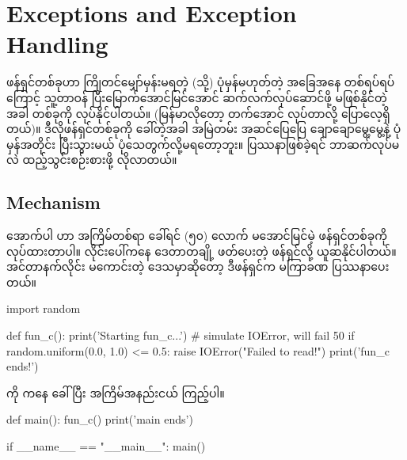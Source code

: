 \chapter{Exceptions and Exception Handling}

ဖန်ရှင်တစ်ခုဟာ ကြိုတင်မျှော်မှန်းမရတဲ့ (သို့) ပုံမှန်မဟုတ်တဲ့ အခြေအနေ တစ်ရပ်ရပ်ကြောင့် သူ့တာဝန် ပြီးမြောက်အောင်မြင်အောင် ဆက်လက်လုပ်ဆောင်ဖို့ မဖြစ်နိုင်တဲ့အခါ  တစ်ခုကို   လုပ်နိုင်ပါတယ်။ (မြန်မာလိုတော့  တက်အောင် လုပ်တာလို့ ပြောလေ့ရှိတယ်)။ ဒီလိုဖန်ရှင်တစ်ခုကို ခေါ်တဲ့အခါ အမြဲတမ်း အဆင်ပြေပြေ ချောချောမွေ့မွေ့နဲ့ ပုံမှန်အတိုင်း ပြီးသွားမယ် ပုံသေတွက်လို့မရတော့ဘူး။ ပြဿနာဖြစ်ခဲ့ရင် ဘာဆက်လုပ်မလဲ ထည့်သွင်းစဉ်းစားဖို့ လိုလာတယ်။
\section{Mechanism}


အောက်ပါ  ဟာ အကြိမ်တစ်ရာ ခေါ်ရင် (၅၀) လောက် မအောင်မြင်မဲ့ ဖန်ရှင်တစ်ခုကို  လုပ်ထားတာပါ။ လိုင်းပေါ်ကနေ ဒေတာတချို့ ဖတ်ပေးတဲ့ ဖန်ရှင်လို့ ယူဆနိုင်ပါတယ်။  အင်တာနက်လိုင်း မကောင်းတဲ့ ဒေသမှာဆိုတော့ ဒီဖန်ရှင်က မကြာခဏ ပြဿနာပေးတယ်။

%
\begin{py}
import random

def fun_c():
    print('Starting fun_c...')
    # simulate IOError, will fail 50%
    if random.uniform(0.0, 1.0) <= 0.5:
        raise IOError("Failed to read!")
    print('fun_c ends!')
\end{py}
%
 ကို  ကနေ ခေါ်ပြီး အကြိမ်အနည်းငယ်  ကြည့်ပါ။
%
\begin{py}
def main():
    fun_c()
    print('main ends')

if __name__ == "__main__":
    main()
\end{py}
%

